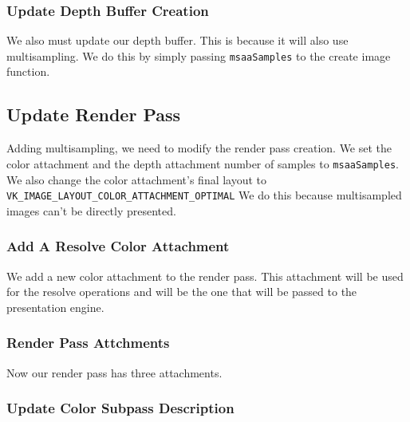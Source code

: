 \subsubsection{Update Depth Buffer Creation}

We also must update our depth buffer.
This is because it will also use multisampling.
We do this by simply passing \texttt{msaaSamples} to the create image
function.

\subsection{Update Render Pass}

Adding multisampling, we need to modify the render pass creation.
We set the color attachment and the depth attachment number of samples to
\texttt{msaaSamples}.
We also change the color attachment's final layout to
\texttt{VK\_IMAGE\_LAYOUT\_COLOR\_ATTACHMENT\_OPTIMAL}
We do this because multisampled images can't be directly presented.

\subsubsection{Add A Resolve Color Attachment}

We add a new color attachment to the render pass.
This attachment will be used for the resolve operations and
will be the one that will be passed to the presentation engine.

\begin{minipage}{\linewidth}{\noindent}
    
\end{minipage}

\subsubsection{Render Pass Attchments}

Now our render pass has three attachments.

\begin{minipage}{\linewidth}{\noindent}
    
\end{minipage}

\subsubsection{Update Color Subpass Description}

